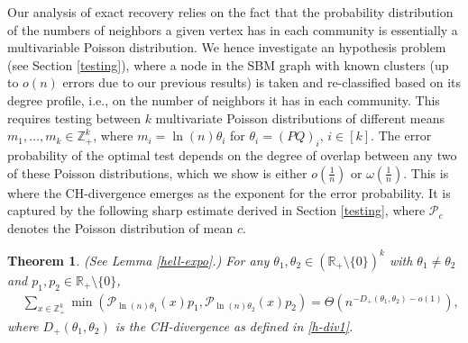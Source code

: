 \documentclass[11pt]{article}
\newcommand{\dd}{D_+}
\newcommand{\mR}{\mathbb{R}}
\newcommand{\mZ}{\mathbb{Z}}
\newcommand{\1}{\mathbb{1}}
\newtheorem{theorem}{Theorem}
\begin{document}
Our analysis of exact recovery relies on the fact that the probability distribution of the numbers of neighbors a given vertex has in each community is essentially a multivariable Poisson distribution. We hence investigate an hypothesis problem (see Section \ref{testing}), where a node in the SBM graph with known clusters (up to $o(n)$ errors due to our previous results) is taken and re-classified based on its degree profile, i.e., on the number of neighbors it has in each community. This requires testing between $k$ multivariate Poisson distributions of different means $m_1,\dots,m_k \in \mZ_+^k$, where $m_i=\ln(n)\theta_i$ for $\theta_i=(PQ)_i$, $i \in [k]$. The error probability of the optimal test depends on the degree of overlap between any two of these Poisson distributions, which we show is either $o(\frac{1}{n})$ or $\omega(\frac{1}{n})$. This is where the CH-divergence emerges as the exponent for the error probability. It is captured by the following sharp estimate derived in Section \ref{testing}, where $\mathcal{P}_{c}$ denotes the Poisson distribution of mean $c$.
\begin{theorem}(See Lemma \ref{hell-expo}.)
For any $\theta_1, \theta_2 \in (\mR_+\setminus \{0\})^k$ with $\theta_1 \neq \theta_2$ and $p_1,p_2 \in \mR_+\setminus \{0\}$, 
\begin{align*}
& \sum_{x \in \mZ_+^k} \min(\mathcal{P}_{\ln(n) \theta_1}(x) p_{1} ,  \mathcal{P}_{\ln(n) \theta_2}(x) p_{2}) = \Theta\left(n^{- \dd(\theta_1,\theta_2) - o(1)} \right),
\end{align*}
where $\dd(\theta_1,\theta_2)$ is the CH-divergence as defined in \eqref{h-div1}.
\end{theorem}
\end{document}
